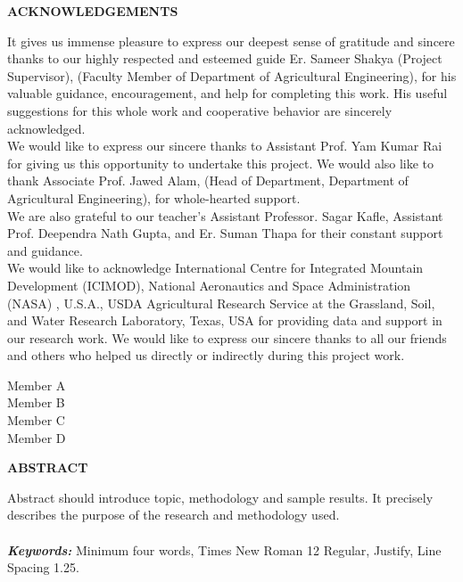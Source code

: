 \documentclass[a4paper, 12pt ]{report}
\begin{document}
	
	\newpage
	\begin{center}\fontsize{18}{0} \textbf{ACKNOWLEDGEMENTS}\end{center}
	{ It gives us immense pleasure to express our deepest sense of gratitude and sincere thanks to our highly respected and esteemed guide Er. Sameer Shakya (Project Supervisor), (Faculty Member of Department of Agricultural Engineering), for his valuable guidance, encouragement, and help for completing this work. His useful suggestions for this whole work and cooperative behavior are sincerely acknowledged.
	\\
	We would like to express our sincere thanks to Assistant Prof. Yam Kumar Rai for giving us this opportunity to undertake this project. We would also like to thank Associate Prof. Jawed Alam, (Head of Department, Department of Agricultural Engineering), for whole-hearted support.
	\\
	We are also grateful to our teacher's Assistant Professor. Sagar Kafle, Assistant Prof. Deependra Nath Gupta, and Er. Suman Thapa for their constant support and guidance.
	\\
	We would like to acknowledge International Centre for Integrated Mountain Development (ICIMOD), National Aeronautics and Space Administration (NASA) , U.S.A., USDA Agricultural Research Service at the Grassland, Soil, and Water Research Laboratory, Texas, USA for providing data and support in our research work. We would like to express our sincere thanks to all our friends and others who helped us directly or indirectly during this project work.
	\\
	\begin{flushright} {
	Member A \\
	Member B\\
	Member C \\
	Member D \\ }
	\end{flushright}
	
	
	\newpage
	\begin{center}\fontsize{18}{0} \textbf{ABSTRACT}\end{center}
	Abstract should introduce topic, methodology and sample results. It precisely describes the purpose of the research and methodology used.\\\\
		{\bf \textit{Keywords:}}
		Minimum four words, Times New Roman 12 Regular, Justify, Line Spacing 1.25.
	
}
\end{document}
